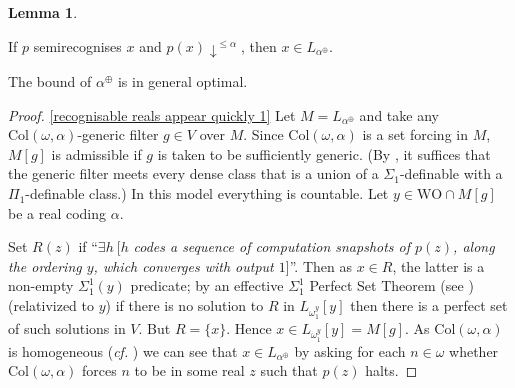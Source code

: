 \documentclass[a4paper,11pt]{amsart}
\theoremstyle{definition}
\newcommand{\WO}{\mathrm{WO}}
\renewcommand{\Col}{\mathrm{Col}}
\newcommand{\PP}{\mathbb{P}}
\newtheorem{lemma}[fact]{Lemma}
\newtheorem*{problem A}{Problem 1}
\newtheorem*{problem B}{Problem 2}
\theoremstyle{remark}
\newenvironment{enumerate-(1)}{\begin{enumerate}[label={\upshape (\arabic*)}, leftmargin=2pc]}{\end{enumerate}}
\begin{document}
\begin{lemma} \
\label{recognisable reals appear quickly} 
\begin{enumerate-(1)} 
\item
\label{recognisable reals appear quickly 1} 
If $p$ semirecognises $x$ and $p(x){\downarrow}^{\leq\alpha}$, then $x\in L_{\alpha^\oplus}$. 
\item 
\label{recognisable reals appear quickly 2} 
The bound of $\alpha^{\oplus}$  is in general optimal.
\end{enumerate-(1)} 
\end{lemma} 
\begin{proof} 
\ref{recognisable reals appear quickly 1} 
Let $M=L_{\alpha^\oplus}$ and take any $\Col(\omega,\alpha)$-generic filter $g\in V$ over $M$. 
Since $\Col(\omega,\alpha)$ is a set forcing in $M$, $M[g]$ is admissible if $g$ is taken to be sufficiently generic. (By \cite[Theorem 10.17]{mathias2015provident}, it suffices that the generic filter meets every dense class that is a union of a $\Sigma_1$-definable with a $\Pi_1$-definable class.)  In this model everything is countable. Let $y\in \WO\cap M[g]$ be a real coding $\alpha$. 

Set $R(z)$ if ``$\exists h\ [ h $ {\em codes a  sequence of computation snapshots of $p(z)$, along the
ordering $y$, which converges with output $1$}]''. Then as $ x \in R$, the latter is a non-empty $\Sigma^{1}_{1}(y)$ predicate; by an effective $\Sigma^{1}_{1}$ Perfect Set Theorem (see \cite[III Thm.6.2]{Sa90})  (relativized to $y$) if there is no solution to $R$ in $L_{\omega_1^y}[y]$ 
then there is a perfect set of such solutions in $V$.  But $R=\{x\}$. Hence $x\in  L_{\omega_{1}^y}[y] = M[g]$. 
As $\Col(\omega,\alpha)$ is homogeneous ({\em cf.}  \cite[Corollary 26.13]{Je03}) we can see that $x\in  L_{\alpha^\oplus}$ by asking for each $n\in\omega$ whether $\Col(\omega,\alpha)$ forces $n$ to be in some real $z$ such that $p(z)$ halts. 


\end{proof}
\end{document}
